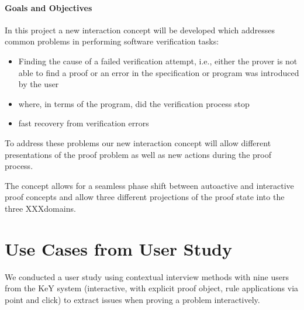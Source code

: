 \documentclass{article}
\begin{document}
\paragraph{Goals and Objectives}
In this project a new interaction concept will be developed which addresses 
common problems in performing software verification tasks:

\begin{itemize}
 \item Finding the cause of a failed verification attempt, i.e., either the 
prover is not able to find a proof or an error in the specification or program 
was introduced by the user
\item where, in terms of the program, did the verification process stop
\item fast recovery from verification errors 
\end{itemize}

To address these problems our new interaction concept will allow different 
presentations of the proof problem as well as new actions during the proof 
process.

The concept allows for a seamless phase shift between autoactive and 
interactive proof concepts and allow three different projections of the proof 
state into the three XXXdomains.

    	


\section{Use Cases from User Study}

We conducted a user study using contextual interview methods with nine users 
from the KeY system (interactive, with explicit proof object, rule applications 
via point and click)
to extract issues when proving a problem interactively.
\end{document}
